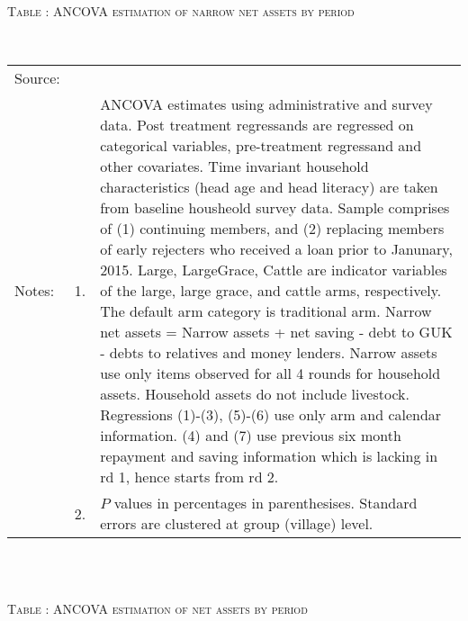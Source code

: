 \hspace{-1cm}\begin{minipage}[t]{14cm} \hfil\textsc{\normalsize Table \thetable: ANCOVA estimation of narrow net assets by period\label{tab ANCOVA narrow net assets timevarying}}\\ \setlength{\tabcolsep}{1pt}
  \setlength{\baselineskip}{8pt}
  \renewcommand{\arraystretch}{.55}
  \hfil{}\\
\renewcommand{\arraystretch}{.8}
\setlength{\tabcolsep}{1pt} \begin{tabular}{>{\hfill\scriptsize}p{1cm}<{}>{\hfill\scriptsize}p{.25cm}<{}>{\scriptsize}p{12cm}<{\hfill}} 
Source:& \multicolumn{2}{l}{\scriptsize Estimated with GUK administrative and survey data.}\\
Notes: & 1. & ANCOVA estimates using administrative and survey data. Post treatment regressands are regressed on categorical variables, pre-treatment regressand and other covariates. Time invariant household characteristics (head age and head literacy) are taken from baseline housheold survey data. Sample comprises of (1) continuing members, and (2) replacing members of early rejecters who received a loan prior to Janunary, 2015.  \textsf{Large}, \textsf{LargeGrace}, \textsf{Cattle} are indicator variables of the \textsf{large}, \textsf{large grace}, and \textsf{cattle} arms, respectively. The default arm category is \textsf{traditional} arm. Narrow net assets = Narrow assets + net saving - debt to GUK - debts to relatives and money lenders. Narrow assets use only items observed for all 4 rounds for household assets. Household assets do not include livestock. Regressions (1)-(3), (5)-(6) use only arm and calendar information. (4) and (7) use previous six month repayment and saving information which is lacking in rd 1, hence starts from rd 2.\\
& 2. &  $P$ values in percentages in parenthesises. Standard errors are clustered at group (village) level. %
 \end{tabular}
\end{minipage} \\\\\hspace{-1cm}\begin{minipage}[t]{14cm} \hfil\textsc{\normalsize Table \thetable: ANCOVA estimation of net assets by period\label{tab ANCOVA net assets timevarying}}\\ \setlength{\tabcolsep}{1pt}

\end{minipage}
